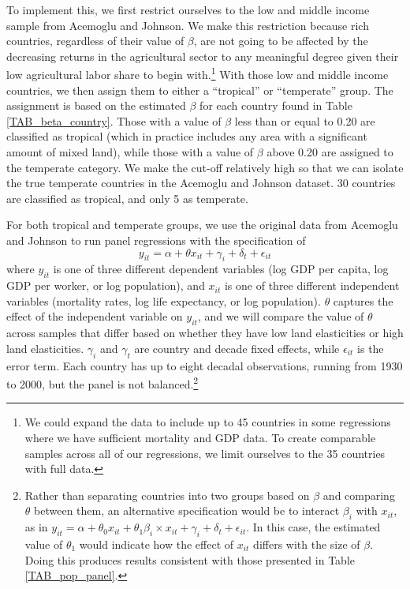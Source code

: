 \documentclass[12pt]{article}
\begin{document}
To implement this, we first restrict ourselves to the low and middle income sample from Acemoglu and Johnson. We make this restriction because rich countries, regardless of their value of $\beta$, are not going to be affected by the decreasing returns in the agricultural sector to any meaningful degree given their low agricultural labor share to begin with.\footnote{We could expand the data to include up to 45 countries in some regressions where we have sufficient mortality and GDP data. To create comparable samples across all of our regressions, we limit ourselves to the 35 countries with full data.} With those low and middle income countries, we then assign them to either a ``tropical'' or ``temperate'' group. The assignment is based on the estimated $\beta$ for each country found in Table \ref{TAB_beta_country}. Those with a value of $\beta$ less than or equal to 0.20 are classified as tropical (which in practice includes any area with a significant amount of mixed land), while those with a value of $\beta$ above 0.20 are assigned to the temperate category. We make the cut-off relatively high so that we can isolate the true temperate countries in the Acemoglu and Johnson dataset. 30 countries are classified as tropical, and only 5 as temperate. 

For both tropical and temperate groups, we use the original data from Acemoglu and Johnson to run panel regressions with the specification of
\begin{equation}
    y_{it} = \alpha + \theta x_{it} + \gamma_i + \delta_t + \epsilon_{it}
\end{equation}
where $y_{it}$ is one of three different dependent variables (log GDP per capita, log GDP per worker, or log population), and $x_{it}$ is one of three different independent variables (mortality rates, log life expectancy, or log population). $\theta$ captures the effect of the independent variable on $y_{it}$, and we will compare the value of $\theta$ across samples that differ based on whether they have low land elasticities or high land elasticities. $\gamma_i$ and $\gamma_t$ are country and decade fixed effects, while $\epsilon_{it}$ is the error term. Each country has up to eight decadal observations, running from 1930 to 2000, but the panel is not balanced.\footnote{Rather than separating countries into two groups based on $\beta$ and comparing $\theta$ between them, an alternative specification would be to interact $\beta_i$ with $x_{it}$, as in $y_{it} = \alpha + \theta_0 x_{it} + \theta_1 \beta_i \times x_{it} + \gamma_i + \delta_t + \epsilon_{it}$. In this case, the estimated value of $\theta_1$ would indicate how the effect of $x_{it}$ differs with the size of $\beta$. Doing this produces results consistent with those presented in Table \ref{TAB_pop_panel}.}
\end{document}
